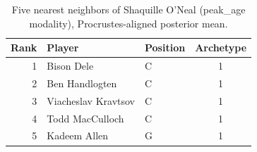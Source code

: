 \begin{table}[htbp]
  \centering\small
  \begin{tabular}{rllc}
    \toprule
    Rank & Player & Position & Archetype \\
    \midrule
    1 & Bison Dele & C & 1 \\
    2 & Ben Handlogten & C & 1 \\
    3 & Viacheslav Kravtsov & C & 1 \\
    4 & Todd MacCulloch & C & 1 \\
    5 & Kadeem Allen & G & 1 \\
    \bottomrule
  \end{tabular}
  \caption{Five nearest neighbors of Shaquille O'Neal (peak_age modality), Procrustes-aligned posterior mean.}
  \label{tab:Shaquille_O_Neal_neighbors_peak_age}
\end{table}

